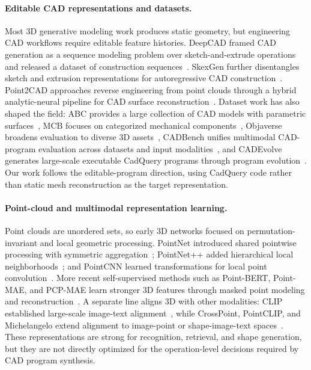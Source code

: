 \documentclass{article}
\begin{document}
\paragraph{Editable CAD representations and datasets.}
Most 3D generative modeling work produces static geometry, but engineering CAD workflows require editable feature histories. DeepCAD framed CAD generation as a sequence modeling problem over sketch-and-extrude operations and released a dataset of construction sequences~\cite{wu2021deepcad}. SkexGen further disentangles sketch and extrusion representations for autoregressive CAD construction~\cite{skexgen}. Point2CAD approaches reverse engineering from point clouds through a hybrid analytic-neural pipeline for CAD surface reconstruction~\cite{point2cad}. Dataset work has also shaped the field: ABC provides a large collection of CAD models with parametric surfaces~\cite{koch2019abc}, MCB focuses on categorized mechanical components~\cite{sangpil2020large}, Objaverse broadens evaluation to diverse 3D assets~\cite{deitke2023objaverse}, CADBench unifies multimodal CAD-program evaluation across datasets and input modalities~\cite{cadbench}, and CADEvolve generates large-scale executable CadQuery programs through program evolution~\cite{elistratov2026cadevolve}. Our work follows the editable-program direction, using CadQuery code rather than static mesh reconstruction as the target representation.

\paragraph{Point-cloud and multimodal representation learning.}
Point clouds are unordered sets, so early 3D networks focused on permutation-invariant and local geometric processing. PointNet introduced shared pointwise processing with symmetric aggregation~\cite{qi2017pointnet}; PointNet++ added hierarchical local neighborhoods~\cite{qi2017pointnet++}; and PointCNN learned transformations for local point convolution~\cite{li2018pointcnn}. More recent self-supervised methods such as Point-BERT, Point-MAE, and PCP-MAE learn stronger 3D features through masked point modeling and reconstruction~\cite{yu2022point,pang2023masked,zhang2024pcp}. A separate line aligns 3D with other modalities: CLIP established large-scale image-text alignment~\cite{radford2021clip}, while CrossPoint, PointCLIP, and Michelangelo extend alignment to image-point or shape-image-text spaces~\cite{afham2022crosspoint,zhang2022pointclip,zhao2023michelangelo}. These representations are strong for recognition, retrieval, and shape generation, but they are not directly optimized for the operation-level decisions required by CAD program synthesis.
\end{document}
